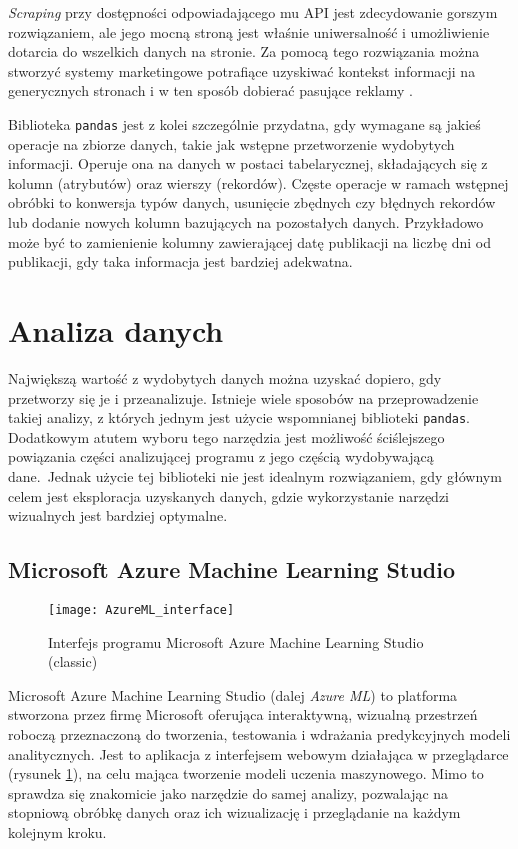 \emph{Scraping} przy dostępności odpowiadającego mu API jest zdecydowanie gorszym rozwiązaniem, ale jego mocną stroną jest właśnie uniwersalność i umożliwienie dotarcia do wszelkich danych na stronie.
Za pomocą tego rozwiązania można stworzyć systemy marketingowe potrafiące uzyskiwać kontekst informacji na generycznych stronach i w ten sposób dobierać pasujące reklamy \cite{vargiu2013exploiting}.

Biblioteka \texttt{pandas} jest z kolei szczególnie przydatna, gdy wymagane są jakieś operacje na zbiorze danych, takie jak wstępne przetworzenie wydobytych informacji.
Operuje ona na danych w postaci tabelarycznej, składających się z kolumn (atrybutów) oraz wierszy (rekordów).
Częste operacje w ramach wstępnej obróbki to konwersja typów danych, usunięcie zbędnych czy błędnych rekordów lub dodanie nowych kolumn bazujących na pozostałych danych.
Przykładowo może być to zamienienie kolumny zawierającej datę publikacji na liczbę dni od publikacji, gdy taka informacja jest bardziej adekwatna.

\section{Analiza danych}

Największą wartość z wydobytych danych można uzyskać dopiero, gdy przetworzy się je i przeanalizuje.
Istnieje wiele sposobów na przeprowadzenie takiej analizy, z których jednym jest użycie wspomnianej biblioteki \texttt{pandas}.
Dodatkowym atutem wyboru tego narzędzia jest możliwość ściślejszego powiązania części analizującej programu z jego częścią wydobywającą dane.\
Jednak użycie tej biblioteki nie jest idealnym rozwiązaniem, gdy głównym celem jest eksploracja uzyskanych danych, gdzie wykorzystanie narzędzi wizualnych jest bardziej optymalne.

\subsection{Microsoft Azure Machine Learning Studio}

\begin{figure}[ht]
	\texttt{[image: AzureML\_interface]}
	\caption{Interfejs programu Microsoft Azure Machine Learning Studio (classic)}
	\label{fig:interface}
\end{figure}

Microsoft Azure Machine Learning Studio (dalej \emph{Azure ML}) to platforma stworzona przez firmę Microsoft oferująca interaktywną, wizualną przestrzeń roboczą przeznaczoną do tworzenia, testowania i wdrażania predykcyjnych modeli analitycznych.
Jest to aplikacja z interfejsem webowym działająca w przeglądarce (rysunek \ref{fig:interface}), na celu mająca tworzenie modeli uczenia maszynowego.
Mimo to sprawdza się znakomicie jako narzędzie do samej analizy, pozwalając na stopniową obróbkę danych oraz ich wizualizację i przeglądanie na każdym kolejnym kroku.

